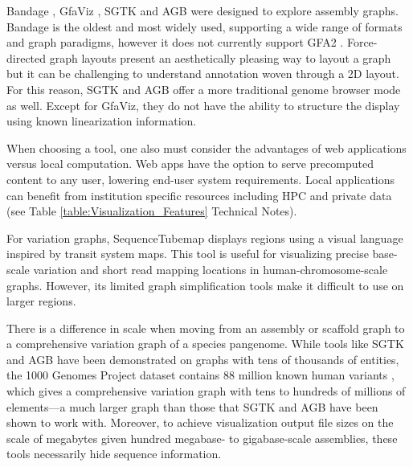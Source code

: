 Bandage \cite{Wick_2015}, GfaViz \cite{Gonnella_2018}, SGTK \cite{Kunyavskaya_2018} and AGB \cite{Mikheenko_2019} were designed to explore assembly graphs.
Bandage is the oldest and most widely used, supporting a wide range of formats and graph  paradigms, however it does not currently support GFA2 \citep{Mikheenko_2019}.
Force-directed graph layouts present an aesthetically pleasing way to layout a graph but it can be challenging to understand annotation woven through a 2D layout.
For this reason, SGTK and AGB offer a more traditional genome browser mode as well.
Except for GfaViz, they do not have the ability to structure the display using known linearization information. 

When choosing a tool, one also must consider the advantages of web applications versus local computation.  
Web apps have the option to serve precomputed content to any user, lowering end-user system requirements.
Local applications can benefit from institution specific resources including HPC and private data (see Table \ref{table:Visualization_Features} Technical Notes).

For variation graphs, SequenceTubemap \cite{Beyer_2019} displays regions using a visual language inspired by transit system maps.
This tool is useful for visualizing precise base-scale variation and short read mapping locations in human-chromosome-scale graphs.
However, its limited graph simplification tools make it difficult to use on larger regions.

There is a difference in scale when moving from an assembly or scaffold graph to a comprehensive variation graph of a species pangenome.
While tools like SGTK and AGB have been demonstrated on graphs with tens of thousands of entities, the 1000 Genomes Project dataset contains 88 million known human variants \citep{1000_2015}, which gives a comprehensive variation graph with tens to hundreds of millions of elements---a much larger graph than those that SGTK and AGB have been shown to work with.
Moreover, to achieve visualization output file sizes on the scale of megabytes given hundred megabase- to gigabase-scale assemblies, these tools necessarily hide sequence information.

